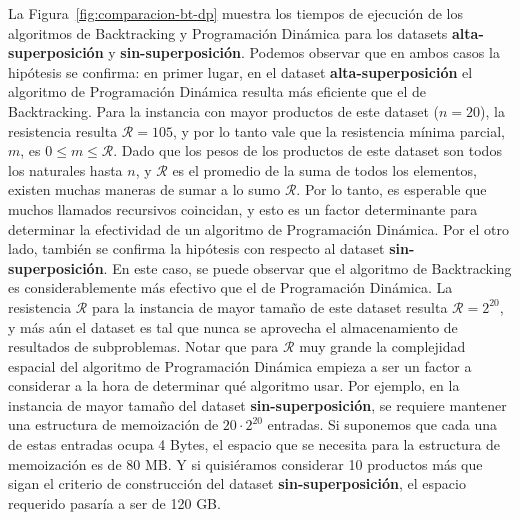 \documentclass{article}
\newcommand{\pd}{Programación Dinámica}
\newcommand{\bt}{Backtracking}
\newcommand{\Res}{\mathcal{R}}
\newcommand{\das}{\textbf{alta-superposición}}
\newcommand{\dss}{\textbf{sin-superposición}}
\begin{document}
La Figura~\ref{fig:comparacion-bt-dp} muestra los tiempos de ejecución de los algoritmos de \bt{} y \pd{} para los datasets \das{} y \dss{}. Podemos observar que en ambos casos la hipótesis se confirma: en primer lugar, en el dataset \das{} el algoritmo de \pd{} resulta más eficiente que el de \bt{}. Para la instancia con mayor productos de este dataset ($n = 20$), la resistencia resulta $\Res = 105$, y por lo tanto vale que la resistencia mínima parcial, $m$, es $0 \leq m \leq \Res$. Dado que los pesos de los productos de este dataset son todos los naturales hasta $n$, y $\Res$ es el promedio de la suma de todos los elementos, existen muchas maneras de sumar a lo sumo $\Res$. Por lo tanto, es esperable que muchos llamados recursivos coincidan, y esto es un factor determinante para determinar la efectividad de un algoritmo de \pd{}. Por el otro lado, también se confirma la hipótesis con respecto al dataset \dss{}. En este caso, se puede observar que el algoritmo de \bt{} es considerablemente más efectivo que el de \pd{}. La resistencia $\Res$ para la instancia de mayor tamaño de este dataset resulta $\Res = 2^{20}$, y más aún el dataset es tal que nunca se aprovecha el almacenamiento de resultados de subproblemas. Notar que para $\Res$ muy grande la complejidad espacial del algoritmo de \pd{} empieza a ser un factor a considerar a la hora de determinar qué algoritmo usar. Por ejemplo, en la instancia de mayor tamaño del dataset \dss{}, se requiere mantener una estructura de memoización de $20 \cdot 2^{20}$ entradas. Si suponemos que cada una de estas entradas ocupa 4 Bytes, el espacio que se necesita para la estructura de memoización es de 80 MB. Y si quisiéramos considerar 10 productos más que sigan el criterio de construcción del dataset \dss{}, el espacio requerido pasaría a ser de 120 GB.
\end{document}
